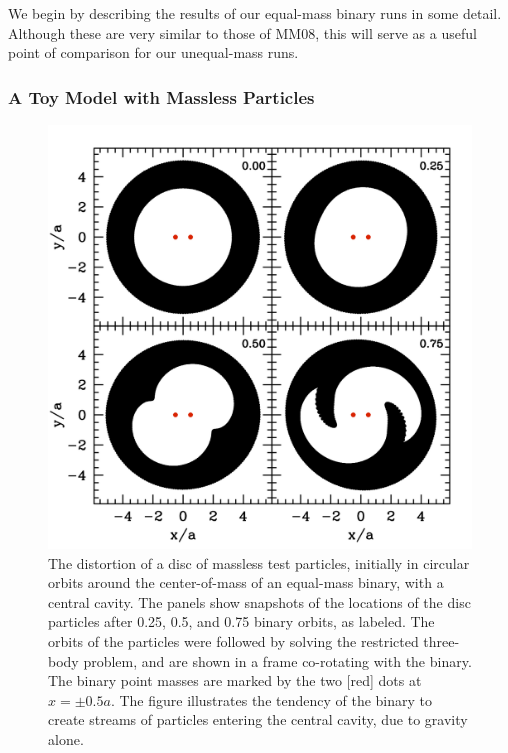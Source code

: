 We begin by describing the results of our equal-mass binary runs in
some detail.  Although these are very similar to those of MM08, this
will serve as a useful point of comparison for our unequal-mass runs.

\subsubsection{A Toy Model with Massless Particles}
\label{A Toy Model}

\begin{figure}
\begin{center}
\includegraphics[scale=0.42]{figures//ch1//binary4.png} 
\caption{The distortion of a disc of massless test particles,
  initially in circular orbits around the center-of-mass of an
  equal-mass binary, with a central cavity.  The panels show snapshots
  of the locations of the disc particles after 0.25, 0.5, and 0.75
  binary orbits, as labeled.  The orbits of the particles were
  followed by solving the restricted three-body problem, and are shown
  in a frame co-rotating with the binary. The binary point masses are
  marked by the two [red] dots at $x=\pm 0.5a$.  The figure
  illustrates the tendency of the binary to create streams of
  particles entering the central cavity, due to gravity alone.}
\label{toydisc}
\end{center}
\end{figure}

